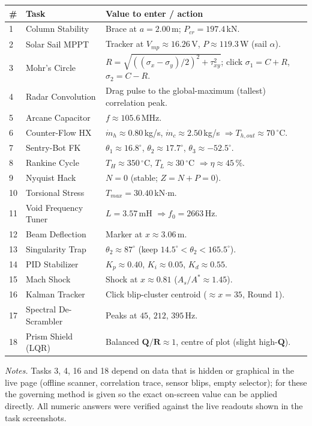 \documentclass[11pt]{article}
\begin{document}
\begin{longtable}{@{}p{0.6cm}p{4.4cm}p{10.5cm}@{}}
\toprule
\textbf{\#} & \textbf{Task} & \textbf{Value to enter / action}\\
\midrule
\endhead
1  & Column Stability      & Brace at $a=2.00$\,m; $P_{cr}=197.4$\,kN.\\
2  & Solar Sail MPPT       & Tracker at $V_{mp}\approx16.26$\,V, $P\approx119.3$\,W (sail $\alpha$).\\
3  & Mohr's Circle         & $R=\sqrt{((\sigma_x-\sigma_y)/2)^2+\tau_{xy}^2}$; click $\sigma_1=C+R$, $\sigma_2=C-R$.\\
4  & Radar Convolution     & Drag pulse to the global-maximum (tallest) correlation peak.\\
5  & Arcane Capacitor      & $f\approx105.6$\,MHz.\\
6  & Counter-Flow HX       & $\dot m_h\approx0.80$\,kg/s, $\dot m_c\approx2.50$\,kg/s $\Rightarrow T_{h,out}\approx70\,^{\circ}$C.\\
7  & Sentry-Bot FK         & $\theta_1\approx16.8^{\circ}$, $\theta_2\approx17.7^{\circ}$, $\theta_3\approx-52.5^{\circ}$.\\
8  & Rankine Cycle         & $T_H\approx350\,^{\circ}$C, $T_L\approx30\,^{\circ}$C $\Rightarrow\eta\approx45\,\%$.\\
9  & Nyquist Hack          & $N=0$ (stable; $Z=N+P=0$).\\
10 & Torsional Stress      & $T_{max}=30.40$\,kN$\cdot$m.\\
11 & Void Frequency Tuner  & $L=3.57$\,mH $\Rightarrow f_0=2663$\,Hz.\\
12 & Beam Deflection       & Marker at $x\approx3.06$\,m.\\
13 & Singularity Trap      & $\theta_2\approx87^{\circ}$ (keep $14.5^{\circ}<\theta_2<165.5^{\circ}$).\\
14 & PID Stabilizer        & $K_p\approx0.40$, $K_i\approx0.05$, $K_d\approx0.55$.\\
15 & Mach Shock            & Shock at $x\approx0.81$ ($A_s/A^{*}\approx1.45$).\\
16 & Kalman Tracker        & Click blip-cluster centroid ($\approx x=35$, Round 1).\\
17 & Spectral De-Scrambler & Peaks at $45$, $212$, $395$\,Hz.\\
18 & Prism Shield (LQR)    & Balanced $\mathbf Q/\mathbf R\approx1$, centre of plot (slight high-$\mathbf Q$).\\
\bottomrule
\end{longtable}

\vspace{6pt}
\textit{Notes.} Tasks 3, 4, 16 and 18 depend on data that is hidden or
graphical in the live page (offline scanner, correlation trace, sensor blips,
empty selector); for these the governing method is given so the exact on-screen
value can be applied directly. All numeric answers were verified against the
live readouts shown in the task screenshots.
\end{document}

